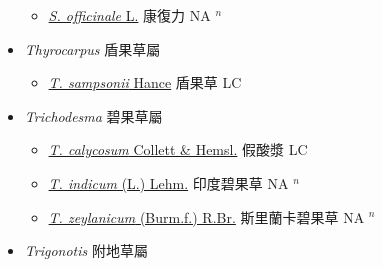 \begin{itemize}
  \begin{itemize}
        \item[] \href{http://www.theplantlist.org/tpl1.1/search?q=Symphytum+officinale}{\textit{S. officinale} L.}   康復力 NA $^n$
  \end{itemize}
 \item[] \textit{Thyrocarpus} 盾果草屬
                    
  \begin{itemize}
        \item[] \href{http://www.theplantlist.org/tpl1.1/search?q=Thyrocarpus+sampsonii}{\textit{T. sampsonii} Hance}   盾果草 LC
  \end{itemize}
 \item[] \textit{Trichodesma} 碧果草屬
                    
  \begin{itemize}
        \item[] \href{http://www.theplantlist.org/tpl1.1/search?q=Trichodesma+calycosum}{\textit{T. calycosum} Collett \& Hemsl.}   假酸漿 LC
        \item[] \href{http://www.theplantlist.org/tpl1.1/search?q=Trichodesma+indicum}{\textit{T. indicum} (L.) Lehm.}   印度碧果草 NA $^n$
        \item[] \href{http://www.theplantlist.org/tpl1.1/search?q=Trichodesma+zeylanicum}{\textit{T. zeylanicum} (Burm.f.) R.Br.}   斯里蘭卡碧果草 NA $^n$
  \end{itemize}
 \item[] \textit{Trigonotis} 附地草屬
                    

\end{itemize}
